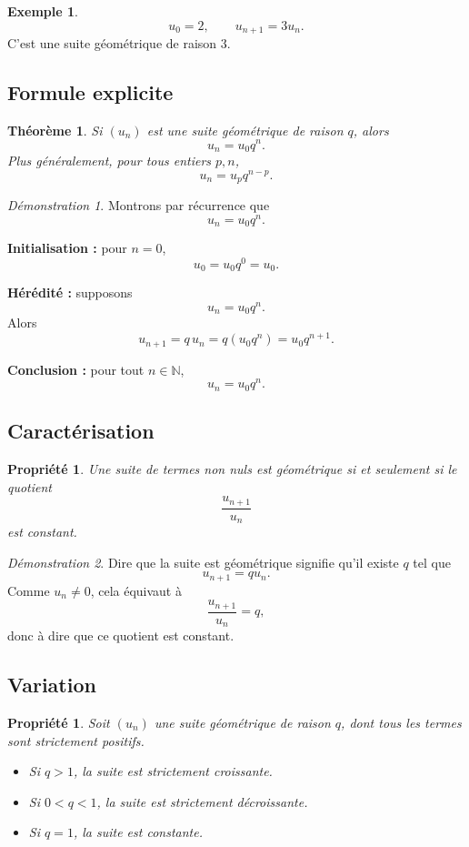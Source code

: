 \documentclass[11pt,a4paper]{article}
\theoremstyle{definition}
\newtheorem{exemple}[definition]{Exemple}
\theoremstyle{plain}
\newtheorem{propriete}[definition]{Propriété}
\newtheorem{theoreme}[definition]{Théorème}
\theoremstyle{remark}
\newtheorem*{demonstrationlibre}{Démonstration}
\newcommand{\N}{\mathbb{N}}
\begin{document}
\begin{exemple}
\[
u_0=2,\qquad u_{n+1}=3u_n.
\]
C'est une suite géométrique de raison $3$.
\end{exemple}

\subsection{Formule explicite}

\begin{theoreme}
Si $(u_n)$ est une suite géométrique de raison $q$, alors
\[
u_n=u_0q^n.
\]
Plus généralement, pour tous entiers $p,n$,
\[
u_n=u_pq^{n-p}.
\]
\end{theoreme}

\begin{demonstrationlibre}
Montrons par récurrence que
\[
u_n=u_0q^n.
\]

\textbf{Initialisation :} pour $n=0$,
\[
u_0=u_0q^0=u_0.
\]

\textbf{Hérédité :} supposons
\[
u_n=u_0q^n.
\]
Alors
\[
u_{n+1}=q\,u_n=q(u_0q^n)=u_0q^{n+1}.
\]

\textbf{Conclusion :} pour tout $n\in\N$,
\[
u_n=u_0q^n.
\]
\end{demonstrationlibre}

\subsection{Caractérisation}

\begin{propriete}
Une suite de termes non nuls est géométrique si et seulement si le quotient
\[
\frac{u_{n+1}}{u_n}
\]
est constant.
\end{propriete}

\begin{demonstrationlibre}
Dire que la suite est géométrique signifie qu'il existe $q$ tel que
\[
u_{n+1}=qu_n.
\]
Comme $u_n\neq0$, cela équivaut à
\[
\frac{u_{n+1}}{u_n}=q,
\]
donc à dire que ce quotient est constant.
\end{demonstrationlibre}

\subsection{Variation}

\begin{propriete}
Soit $(u_n)$ une suite géométrique de raison $q$, dont tous les termes sont strictement positifs.
\begin{itemize}[leftmargin=0.8cm]
    \item Si $q>1$, la suite est strictement croissante.
    \item Si $0<q<1$, la suite est strictement décroissante.
    \item Si $q=1$, la suite est constante.
\end{itemize}
\end{propriete}
\end{document}
